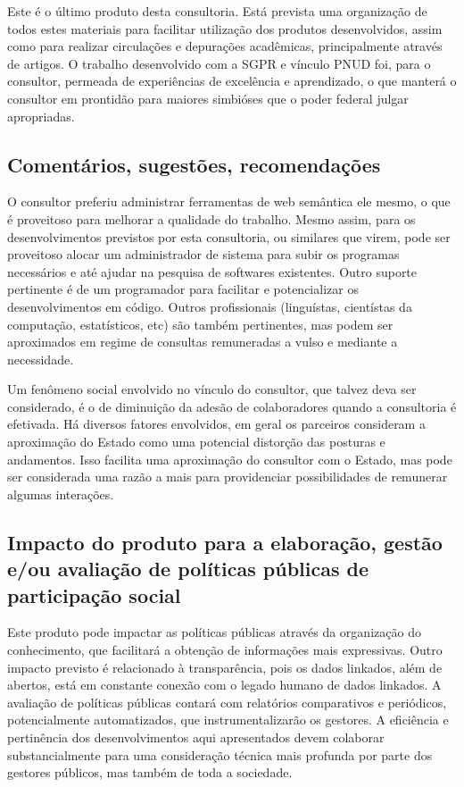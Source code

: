 \documentclass[12pt]{article}
\begin{document}
Este é o último produto desta consultoria. Está prevista uma organização de todos estes materiais para facilitar utilização dos produtos desenvolvidos, assim como para realizar circulações e depurações acadêmicas, principalmente através de artigos. O trabalho desenvolvido com a SGPR e vínculo PNUD foi, para o consultor, permeada de experiências de excelência e aprendizado, o que manterá o consultor em prontidão para maiores simbióses que o poder federal julgar apropriadas.

\subsection{Comentários, sugestões, recomendações}
O consultor preferiu administrar ferramentas de web semântica ele mesmo, o que é proveitoso para melhorar a qualidade do trabalho. Mesmo assim, para os desenvolvimentos previstos por esta consultoria, ou similares que virem, pode ser proveitoso alocar um administrador de sistema para subir os programas necessários e até ajudar na pesquisa de softwares existentes. Outro suporte pertinente é de um programador para facilitar e potencializar os desenvolvimentos em código. Outros profissionais (linguístas, cientístas da computação, estatísticos, etc) são também pertinentes, mas podem ser aproximados em regime de consultas remuneradas a vulso e mediante a necessidade.

Um fenômeno social envolvido no vínculo do consultor, que talvez deva ser considerado, é o de diminuição da adesão de colaboradores quando a consultoria é efetivada. Há diversos fatores envolvidos, em geral os parceiros consideram a aproximação do Estado como uma potencial distorção das posturas e andamentos. Isso facilita uma aproximação do consultor com o Estado, mas pode ser considerada uma razão a mais para providenciar possibilidades de remunerar algumas interações.

\subsection{Impacto do produto para a elaboração, gestão e/ou avaliação de políticas públicas de participação social}
Este produto pode impactar as políticas públicas através da organização do conhecimento, que facilitará a obtenção de informações mais expressivas.  Outro impacto previsto é relacionado à transparência, pois os dados linkados, além de abertos, está em constante conexão com o legado humano de dados linkados. A avaliação de políticas públicas contará com relatórios comparativos e periódicos, potencialmente automatizados, que instrumentalizarão os gestores. A eficiência e pertinência dos desenvolvimentos aqui apresentados devem colaborar substancialmente para uma consideração técnica mais profunda por parte dos gestores públicos, mas também de toda a sociedade.
\end{document}

